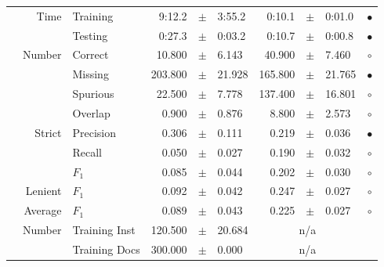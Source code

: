 \begin{longtable}{|r|r|l||rcl|rcl|c|}
\cline{2-10} & \multirow{2}{*}{      Time} &        Training &      9:12.2 &  $\pm$  &      3:55.2 &      0:10.1 &  $\pm$  &      0:01.0 & $\bullet$ \\
\cline{3-10} &                             &         Testing &      0:27.3 &  $\pm$  &      0:03.2 &      0:10.7 &  $\pm$  &      0:00.8 & $\bullet$ \\
\hline
\pagebreak
\hline
\hline
\multirow{11}{*}{\begin{sideways}sellerabr\end{sideways} }
             & \multirow{4}{*}{    Number} &         Correct &      10.800 &  $\pm$  &       6.143 &      40.900 &  $\pm$  &       7.460 & $\circ$ \\
\cline{3-10} &                             &         Missing &     203.800 &  $\pm$  &      21.928 &     165.800 &  $\pm$  &      21.765 & $\bullet$ \\
\cline{3-10} &                             &        Spurious &      22.500 &  $\pm$  &       7.778 &     137.400 &  $\pm$  &      16.801 & $\circ$ \\
\cline{3-10} &                             &         Overlap &       0.900 &  $\pm$  &       0.876 &       8.800 &  $\pm$  &       2.573 & $\circ$ \\
\cline{2-10} & \multirow{3}{*}{    Strict} &       Precision &       0.306 &  $\pm$  &       0.111 &       0.219 &  $\pm$  &       0.036 & $\bullet$ \\
\cline{3-10} &                             &          Recall &       0.050 &  $\pm$  &       0.027 &       0.190 &  $\pm$  &       0.032 & $\circ$ \\
\cline{3-10} &                             &           $F_1$ &       0.085 &  $\pm$  &       0.044 &       0.202 &  $\pm$  &       0.030 & $\circ$ \\
\cline{2-10} &                     Lenient &           $F_1$ &       0.092 &  $\pm$  &       0.042 &       0.247 &  $\pm$  &       0.027 & $\circ$ \\
\cline{2-10} &                     Average &           $F_1$ &       0.089 &  $\pm$  &       0.043 &       0.225 &  $\pm$  &       0.027 & $\circ$ \\
\cline{2-10} & \multirow{2}{*}{    Number} &   Training Inst &     120.500 &  $\pm$  &      20.684 &    \multicolumn{3}{c|}{n/a}         &  \\
\cline{3-10} &                             &   Training Docs &     300.000 &  $\pm$  &       0.000 &    \multicolumn{3}{c|}{n/a}         &  \\

\end{longtable}
